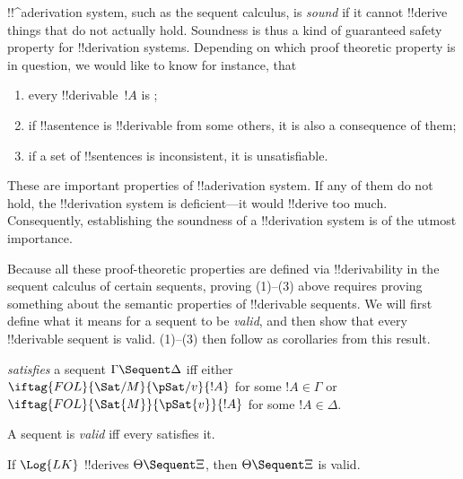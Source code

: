 \documentclass[../../../include/open-logic-section]{subfiles}
\begin{document}
      {}
      {}


\begin{explain}
!!^a{derivation} system, such as the sequent calculus, is \emph{sound}
if it cannot !!{derive} things that do not actually hold.  Soundness is
thus a kind of guaranteed safety property for !!{derivation} systems.
Depending on which proof theoretic property is in question, we would
like to know for instance, that
\begin{enumerate}
\item every !!{derivable}~$!A$ is ;
\item if !!a{sentence} is !!{derivable} from some others, it is also a
  consequence of them;
\item if a set of !!{sentence}s is inconsistent, it is unsatisfiable.
\end{enumerate}
These are important properties of !!a{derivation} system.  If any of
them do not hold, the !!{derivation} system is deficient---it would
!!{derive} too much.  Consequently, establishing the soundness of a
!!{derivation} system is of the utmost importance.

Because all these proof-theoretic properties are defined via
!!{derivability} in the sequent calculus of certain sequents, proving
(1)--(3) above requires proving something about the semantic
properties of !!{derivable} sequents.  We will first define what it
means for a sequent to be \emph{valid}, and then show that every
!!{derivable} sequent is valid.  (1)--(3) then follow as corollaries
from this result.
\end{explain}

\begin{defn}
 \emph{satisfies} a sequent
$\Gamma \Sequent \Delta$ iff either
$\iftag{FOL}{\Sat/{M}}{\pSat/{v}}{!A}$ for some $!A \in \Gamma$ or
$\iftag{FOL}{\Sat{M}}{\pSat{v}}{!A}$ for some $!A \in \Delta$.

A sequent is \emph{valid} iff every  satisfies it.
\end{defn}

\begin{thm}[Soundness]
 If $\Log{LK}$ !!{derive}s $\Theta
\Sequent \Xi$, then $\Theta \Sequent \Xi$ is valid.
\end{thm}
\end{document}
